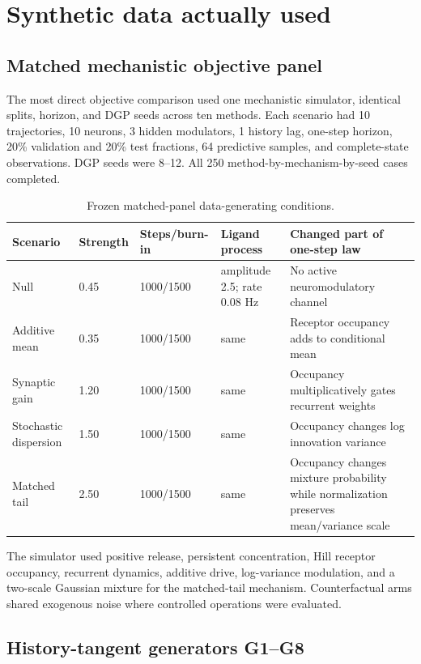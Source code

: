 \documentclass[10pt]{article}
\begin{document}
\section{Synthetic data actually used}

\subsection{Matched mechanistic objective panel}

The most direct objective comparison used one mechanistic simulator, identical splits, horizon, and DGP seeds across ten methods. Each scenario had 10 trajectories, 10 neurons, 3 hidden modulators, 1 history lag, one-step horizon, 20\% validation and 20\% test fractions, 64 predictive samples, and complete-state observations. DGP seeds were 8--12. All 250 method-by-mechanism-by-seed cases completed.

\begin{table}[H]
\centering\small
\begin{tabularx}{\linewidth}{L{2.4cm}L{1.2cm}L{1.7cm}L{2.0cm}Y}
\toprule
Scenario & Strength & Steps/burn-in & Ligand process & Changed part of one-step law \\
\midrule
Null & 0.45 & 1000/1500 & amplitude 2.5; rate 0.08 Hz & No active neuromodulatory channel \\
Additive mean & 0.35 & 1000/1500 & same & Receptor occupancy adds to conditional mean \\
Synaptic gain & 1.20 & 1000/1500 & same & Occupancy multiplicatively gates recurrent weights \\
Stochastic dispersion & 1.50 & 1000/1500 & same & Occupancy changes log innovation variance \\
Matched tail & 2.50 & 1000/1500 & same & Occupancy changes mixture probability while normalization preserves mean/variance scale \\
\bottomrule
\end{tabularx}
\caption{Frozen matched-panel data-generating conditions.}
\end{table}

The simulator used positive release, persistent concentration, Hill receptor occupancy, recurrent dynamics, additive drive, log-variance modulation, and a two-scale Gaussian mixture for the matched-tail mechanism. Counterfactual arms shared exogenous noise where controlled operations were evaluated.

\subsection{History-tangent generators G1--G8}
\end{document}
